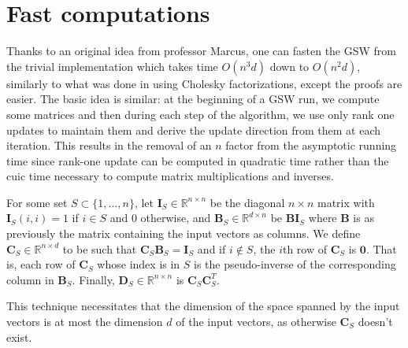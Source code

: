 \documentclass[12pt]{article}
\begin{document}
\section{Fast computations}\label{fast_computations}
Thanks to an original idea from professor Marcus, one can fasten the GSW from the trivial implementation which takes time $O(n^3d)$ down to $O(n^2d)$, similarly to what was done in \cite{harshaw2019balancing} using Cholesky factorizations, except the proofs are easier. The basic idea is similar: at the beginning of a GSW run, we compute some matrices and then during each step of the algorithm, we use only rank one updates to maintain them and derive the update direction from them at each iteration. This results in the removal of an $n$ factor from the asymptotic running time since rank-one update can be computed in quadratic time rather than the cuic time necessary to compute matrix multiplications and inverses.

For some set $S\subset\{1,\dots,n\}$, let $\textbf{I}_S\in\mathbb{R}^{n\times n}$ be the diagonal $n\times n$ matrix with $\textbf{I}_S(i,i) =1$ if $i\in S$ and $0$ otherwise, and $\textbf{B}_S\in\mathbb{R}^{d\times n}$ be $\textbf{BI}_S$ where $\textbf{B}$ is as previously the matrix containing the input vectors as columns. We define $\textbf{C}_S\in\mathbb{R}^{n\times d}$ to be such that $\textbf{C}_S\textbf{B}_S=\textbf{I}_S$ and if $i\not\in S$, the $i$th row of $\textbf{C}_S$ is $\textbf{0}$. That is, each row of $\textbf{C}_S$ whose index is in $S$ is the pseudo-inverse of the corresponding column in $\textbf{B}_S$. Finally, $\textbf{D}_S\in\mathbb{R}^{n\times n}$ is $\textbf{C}_S\textbf{C}_S^T$.

This technique necessitates that the dimension of the space spanned by the input vectors is at most the dimension $d$ of the input vectors, as otherwise $\textbf{C}_S$ doesn't exist. %
\end{document}

